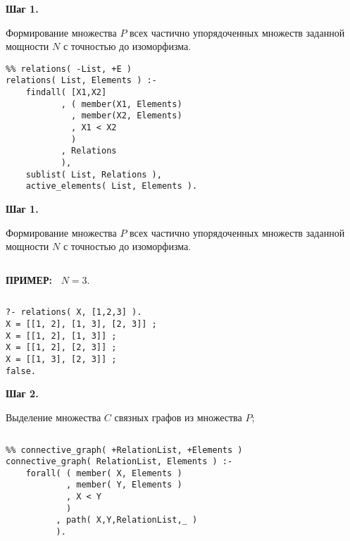 \documentclass{beamer}
\newcommand{\green}{\color[rgb]{0,0.4,0}}
\newcommand{\examp}{%
     {\bf \green ПРИМЕР:\ }}
\newcommand{\retline}{

$ $

}
\begin{document}
\begin{frame}[fragile]
{\bf Шаг 1.}

Формирование множества $P$ всех частично упорядоченных множеств заданной мощности $N$ с точностью до изоморфизма.

{\scriptsize
\begin{lstlisting}
%% relations( -List, +E )  
relations( List, Elements ) :-
    findall( [X1,X2]
           , ( member(X1, Elements)
             , member(X2, Elements)
             , X1 < X2
             )
           , Relations
           ),
	sublist( List, Relations ),
	active_elements( List, Elements ).
\end{lstlisting}	
}

\end{frame}

\begin{frame}[fragile]
{\bf Шаг 1.}

Формирование множества $P$ всех частично упорядоченных множеств заданной мощности $N$ с точностью до изоморфизма.
{\retline}

{\examp} $N = 3$.
{\retline}
{\scriptsize
\begin{lstlisting}
?- relations( X, [1,2,3] ).
X = [[1, 2], [1, 3], [2, 3]] ;
X = [[1, 2], [1, 3]] ;
X = [[1, 2], [2, 3]] ;
X = [[1, 3], [2, 3]] ;
false.
\end{lstlisting}
}

\end{frame}

\begin{frame}[fragile]
{\bf Шаг 2.}

Выделение множества $C$ связных графов из множества $P$;
{\retline}

{\scriptsize
\begin{lstlisting}
%% connective_graph( +RelationList, +Elements )
connective_graph( RelationList, Elements ) :-
    forall( ( member( X, Elements )
            , member( Y, Elements )
            , X < Y
            )
          , path( X,Y,RelationList,_ )
          ).
\end{lstlisting}
}
\end{frame}
\end{document}
